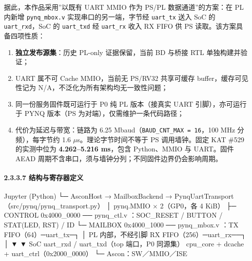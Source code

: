 据此，本作品采用''以既有 UART MMIO 作为 PS/PL 数据通道''的方案：在 PL 内新增 \texttt{pynq\_\allowbreak{}mbox.\allowbreak{}v} 实现串口的另一端，字节经 \texttt{uart\_\allowbreak{}tx} 送入 SoC 的 \texttt{uart\_\allowbreak{}rxd}，SoC 的 \texttt{uart\_\allowbreak{}txd} 经 \texttt{uart\_\allowbreak{}rx} 收入 RX FIFO 供 PS 读取。该方案具备四项性质：

\begin{enumerate}
\def\labelenumi{\arabic{enumi}.}
\tightlist
\item
  \textbf{独立发布源集}：历史 PL-only 证据保留，当前 BD 与桥接 RTL 单独构建并验证；
\item
  UART 属不可 Cache MMIO，当前无 PS/RV32 共享可缓存 buffer，缓存可见性记为 N/A，不泛化为所有架构均无一致性问题；
\item
  同一份服务固件既可运行于 P0 纯 PL 版本（接真实 UART 引脚），亦可运行于 PYNQ 版本（PS 为对端），仅需维护一条代码路径；
\item
  代价为延迟与带宽：链路为 6.25 Mbaud（\texttt{BAUD\_\allowbreak{}CNT\_\allowbreak{}MAX\ =\ 16}，100 MHz 分频），每字节约 1.6 $\mu$s。理论字节时间不等于 PS 调用墙钟。固定 KAT \#529 的实测中位为 \textbf{4.262--5.216 ms}，包含 Python、MMIO 与 UART。固件 AEAD 周期不含串口，须与墙钟分列；不同固件边界仍会影响周期。
\end{enumerate}

\Needspace{170pt}

\paragraph{2.3.3.7 结构与寄存器定义}

\begin{codeblock}[samepage=true]
Jupyter (Python)
  └─ AsconHost → MailboxBackend → PynqUartTransport（src/pynq/pynq_transport.py）
        │  pynq.MMIO × 2（GP0，各 4 KiB）
        ├─ CONTROL 0x4000_0000 ── pynq_ctl.v  ：SOC_RESET / BUTTON / STAT(LED, RST) / ID
        └─ MAILBOX 0x4000_1000 ── pynq_mbox.v ：TX FIFO（64）─uart_tx─┐
                                                                     │ PL 内部，不经引脚
                                        RX FIFO（256）─uart_rx──┐    │
                                                               ▼    ▼
                                            SoC uart_rxd / uart_txd（top 端口，P0 同源集）
                                              cpu_core + dcache + uart_ctrl（0x2000_0000）
                                                        └─ Ascon：SW／MMIO／ISE
\end{codeblock}

